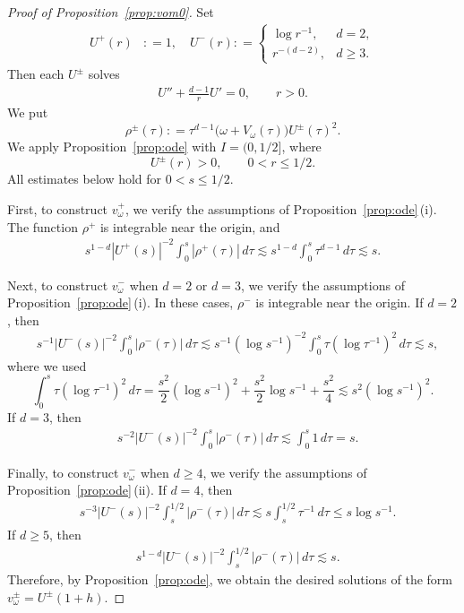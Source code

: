 \documentclass[12pt, a4paper, reqno]{amsart}
\numberwithin{equation}{section}
\theoremstyle{definition}
\theoremstyle{remark}
\newcommand{\ce}{\mathrel{\mathop:}=}
\begin{document}
\begin{proof}[Proof of Proposition~\ref{prop:vom0}]
Set
\begin{align*}
    U^+(r)
   &\ce 1,\quad
    U^-(r)
   \ce  \begin{cases}
    \log r^{-1}, & d=2,
\\  r^{-(d-2)}, & d\ge 3.
  \end{cases}
\end{align*}
Then each $U^\pm$ solves
\begin{align*}
 U''+\frac{d-1}{r}U'=0,\qquad r>0.
\end{align*}
We put
\[
  \rho^{\pm}(\tau)
    \ce \tau^{d-1}\bigl(\omega+V_\omega(\tau)\bigr)U^{\pm}(\tau)^2.
\]
We apply Proposition~\ref{prop:ode} with $I=(0,1/2]$, where
\[
  U^\pm(r)>0,\qquad 0<r\le1/2.
\]
All estimates below hold for $0<s\le1/2$.

First, to construct $v_\omega^+$, we verify the assumptions of Proposition~\ref{prop:ode}\,\textup{(i)}. The function $\rho^+$ is integrable near the origin, and
\begin{align*}
    s^{1-d}|U^+(s)|^{-2}\int_0^s |\rho^+(\tau)|\,d\tau
    \lesssim s^{1-d}\int_0^s\tau^{d-1}\,d\tau
    \lesssim s.
\end{align*}

Next, to construct $v_\omega^-$ when $d=2$ or $d=3$, we verify the assumptions of Proposition~\ref{prop:ode}\,\textup{(i)}. In these cases, $\rho^-$ is integrable near the origin. If $d=2$, then
\begin{align*}
   &s^{-1}|U^-(s)|^{-2}\int_0^s |\rho^-(\tau)|\,d\tau
    \lesssim s^{-1}(\log s^{-1})^{-2}\int_0^s \tau(\log \tau^{-1})^2\,d\tau
    \lesssim s,
\end{align*}
where we used
\[
  \int_0^s \tau(\log \tau^{-1})^2\,d\tau
    =\frac{s^2}{2}(\log s^{-1})^2+\frac{s^2}{2}\log s^{-1}+\frac{s^2}{4}
    \lesssim s^2(\log s^{-1})^2.
\]
If $d=3$, then
\begin{align*}
   &s^{-2}|U^-(s)|^{-2}\int_0^s |\rho^-(\tau)|\,d\tau
    \lesssim \int_0^s 1\,d\tau
    = s.
\end{align*}

Finally, to construct $v_\omega^-$ when $d\ge 4$, we verify the assumptions of Proposition~\ref{prop:ode}\,\textup{(ii)}. If $d=4$, then
\begin{align*}
   &s^{-3}|U^-(s)|^{-2}\int_s^{1/2} |\rho^-(\tau)|\,d\tau
    \lesssim s\int_s^{1/2}\tau^{-1}\,d\tau
    \le s\log s^{-1}.
\end{align*}
If $d\ge 5$, then
\begin{align*}
   &s^{1-d}|U^-(s)|^{-2}\int_s^{1/2} |\rho^-(\tau)|\,d\tau
    \lesssim s.
\end{align*}
Therefore, by Proposition~\ref{prop:ode}, we obtain the desired solutions of the form $v_\omega^\pm=U^{\pm}(1+h)$.
\end{proof}
\end{document}
